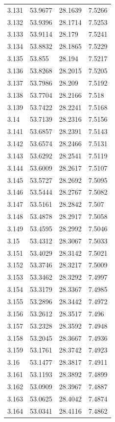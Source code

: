 \begin{tabular}{llll}
3.131 & 53.9677 & 28.1639 & 7.5266 \\
3.132 & 53.9396 & 28.1714 & 7.5253 \\
3.133 & 53.9114 & 28.179 & 7.5241 \\
3.134 & 53.8832 & 28.1865 & 7.5229 \\
3.135 & 53.855 & 28.194 & 7.5217 \\
3.136 & 53.8268 & 28.2015 & 7.5205 \\
3.137 & 53.7986 & 28.209 & 7.5192 \\
3.138 & 53.7704 & 28.2166 & 7.518 \\
3.139 & 53.7422 & 28.2241 & 7.5168 \\
3.14 & 53.7139 & 28.2316 & 7.5156 \\
3.141 & 53.6857 & 28.2391 & 7.5143 \\
3.142 & 53.6574 & 28.2466 & 7.5131 \\
3.143 & 53.6292 & 28.2541 & 7.5119 \\
3.144 & 53.6009 & 28.2617 & 7.5107 \\
3.145 & 53.5727 & 28.2692 & 7.5095 \\
3.146 & 53.5444 & 28.2767 & 7.5082 \\
3.147 & 53.5161 & 28.2842 & 7.507 \\
3.148 & 53.4878 & 28.2917 & 7.5058 \\
3.149 & 53.4595 & 28.2992 & 7.5046 \\
3.15 & 53.4312 & 28.3067 & 7.5033 \\
3.151 & 53.4029 & 28.3142 & 7.5021 \\
3.152 & 53.3746 & 28.3217 & 7.5009 \\
3.153 & 53.3462 & 28.3292 & 7.4997 \\
3.154 & 53.3179 & 28.3367 & 7.4985 \\
3.155 & 53.2896 & 28.3442 & 7.4972 \\
3.156 & 53.2612 & 28.3517 & 7.496 \\
3.157 & 53.2328 & 28.3592 & 7.4948 \\
3.158 & 53.2045 & 28.3667 & 7.4936 \\
3.159 & 53.1761 & 28.3742 & 7.4923 \\
3.16 & 53.1477 & 28.3817 & 7.4911 \\
3.161 & 53.1193 & 28.3892 & 7.4899 \\
3.162 & 53.0909 & 28.3967 & 7.4887 \\
3.163 & 53.0625 & 28.4042 & 7.4874 \\
3.164 & 53.0341 & 28.4116 & 7.4862 \\

\end{tabular}
